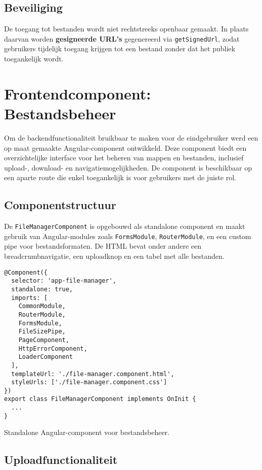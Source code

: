 \subsection{Beveiliging}

De toegang tot bestanden wordt niet rechtstreeks openbaar gemaakt. In plaats daarvan worden \textbf{gesigneerde URL’s} gegenereerd via \texttt{getSignedUrl}, zodat gebruikers tijdelijk toegang krijgen tot een bestand zonder dat het publiek toegankelijk wordt.

\section{Frontendcomponent: Bestandsbeheer}

Om de backendfunctionaliteit bruikbaar te maken voor de eindgebruiker werd een op maat gemaakte Angular-component ontwikkeld. Deze component biedt een overzichtelijke interface voor het beheren van mappen en bestanden, inclusief upload-, download- en navigatiemogelijkheden. De component is beschikbaar op een aparte route die enkel toegankelijk is voor gebruikers met de juiste rol.

\subsection{Componentstructuur}

De \texttt{FileManagerComponent} is opgebouwd als standalone component en maakt gebruik van Angular-modules zoals \texttt{FormsModule}, \texttt{RouterModule}, en een custom pipe voor bestandsformaten. De HTML bevat onder andere een breadcrumbnavigatie, een uploadknop en een tabel met alle bestanden.

\begin{listing}[H]
\begin{verbatim}
@Component({
  selector: 'app-file-manager',
  standalone: true,
  imports: [
    CommonModule,
    RouterModule,
    FormsModule,
    FileSizePipe,
    PageComponent,
    HttpErrorComponent,
    LoaderComponent
  ],
  templateUrl: './file-manager.component.html',
  styleUrls: ['./file-manager.component.css']
})
export class FileManagerComponent implements OnInit {
  ...
}
\end{verbatim}
\caption[Structuur van de FileManagerComponent]{Standalone Angular-component voor bestandsbeheer.}
\end{listing}

\subsection{Uploadfunctionaliteit}

